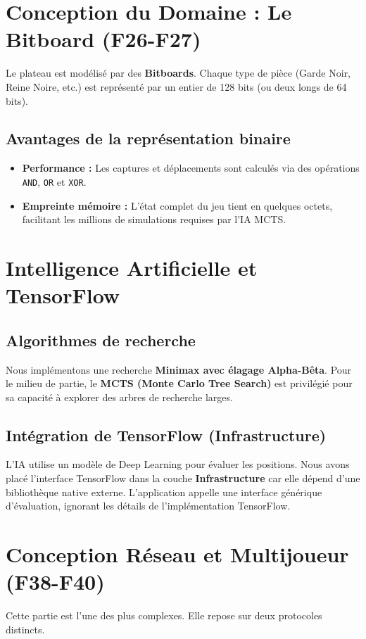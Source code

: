 \documentclass[10pt]{article} %
\begin{document}
\section{Conception du Domaine : Le Bitboard (F26-F27)}
Le plateau est modélisé par des \textbf{Bitboards}. Chaque type de pièce (Garde Noir, Reine Noire, etc.) est représenté par un entier de 128 bits (ou deux longs de 64 bits).

\subsection{Avantages de la représentation binaire}
\begin{itemize}
    \item \textbf{Performance :} Les captures et déplacements sont calculés via des opérations \texttt{AND}, \texttt{OR} et \texttt{XOR}.
    \item \textbf{Empreinte mémoire :} L'état complet du jeu tient en quelques octets, facilitant les millions de simulations requises par l'IA MCTS.
\end{itemize}

\section{Intelligence Artificielle et TensorFlow}

\subsection{Algorithmes de recherche}
Nous implémentons une recherche \textbf{Minimax avec élagage Alpha-Bêta}. Pour le milieu de partie, le \textbf{MCTS (Monte Carlo Tree Search)} est privilégié pour sa capacité à explorer des arbres de recherche larges.

\subsection{Intégration de TensorFlow (Infrastructure)}
L'IA utilise un modèle de Deep Learning pour évaluer les positions. Nous avons placé l'interface TensorFlow dans la couche \textbf{Infrastructure} car elle dépend d'une bibliothèque native externe. L'application appelle une interface générique d'évaluation, ignorant les détails de l'implémentation TensorFlow.


\section{Conception Réseau et Multijoueur (F38-F40)}
Cette partie est l'une des plus complexes. Elle repose sur deux protocoles distincts.
\end{document}
